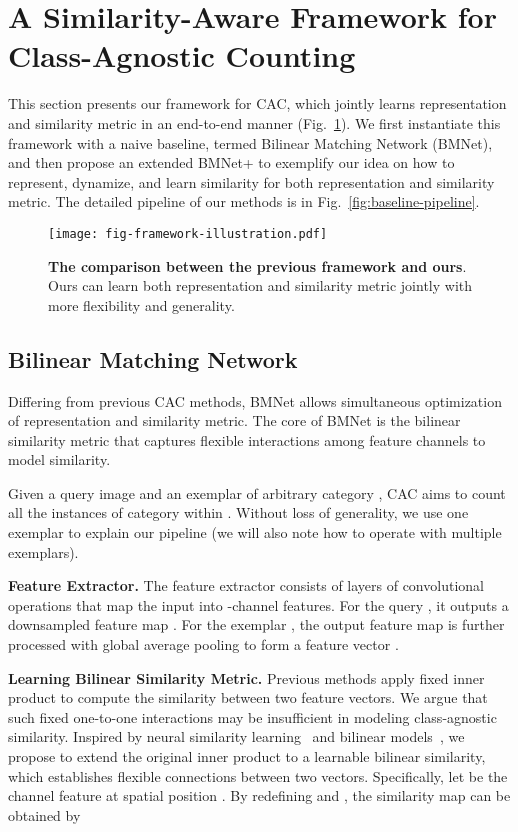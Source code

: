 \documentclass[10pt,twocolumn,letterpaper]{article}
\newcommand{\margin}{\vspace{3pt}\noindent}
\begin{document}
\section{A Similarity-Aware Framework for Class-Agnostic Counting}
This section presents our framework for CAC, which jointly learns representation and similarity metric in an end-to-end manner (Fig.~\ref{fig:basic-framework}). We first instantiate this framework with a naive baseline, termed Bilinear Matching Network (BMNet), and then propose an extended BMNet+ to exemplify our idea on how to represent, dynamize, and learn similarity for both representation and similarity metric. The detailed pipeline of our methods is in Fig.~\ref{fig:baseline-pipeline}.
\begin{figure}[t]
  \centering
   \texttt{[image: fig-framework-illustration.pdf]}\vspace{-5pt}
   \caption{\textbf{The comparison between the previous framework and ours}. Ours can learn both representation and similarity metric jointly with more flexibility and generality.}
   \label{fig:basic-framework}
   \vspace{-5pt}
\end{figure}

\subsection{Bilinear Matching Network}
\label{sec:bmn}
Differing from previous CAC methods, BMNet allows simultaneous optimization of representation and similarity metric. The core of BMNet is the bilinear similarity metric that captures flexible interactions among feature channels to model similarity. 

Given a query image  and an exemplar  of arbitrary category , CAC aims to count all the instances of category  within . Without loss of generality, we use one exemplar to explain our pipeline (we will also note how to operate with multiple exemplars). 

\margin
\textbf{Feature Extractor. }
The feature extractor consists of layers of convolutional operations that map the input into -channel features. For the query , it outputs a downsampled feature map . For the exemplar , the output feature map is further processed with global average pooling to form a feature vector . 

\margin
\textbf{Learning Bilinear Similarity Metric.}
Previous methods apply fixed inner product to compute the similarity between two feature vectors. We argue that such fixed one-to-one interactions may be insufficient in modeling class-agnostic similarity. Inspired by neural similarity learning~\cite{neural_similarity_learning} and bilinear models~\cite{low_rank_bp}, we propose to extend the original inner product to a learnable bilinear similarity, which establishes flexible connections between two vectors. Specifically, let  be the channel feature at spatial position . By redefining  and , the similarity map  can be obtained by
\end{document}
